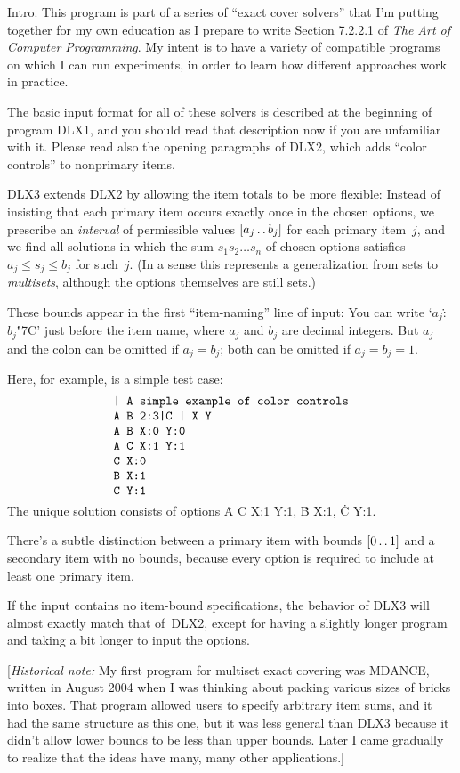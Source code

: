 
\let\Xmod=\bmod %
\def\dts{\mathinner{\ldotp\ldotp}}

\datethis

Intro. This program is part of a series of ``exact cover solvers'' that
I'm putting together for my own education as I prepare to write Section
7.2.2.1 of {\sl The Art of Computer Programming}. My intent is to
have a variety of compatible programs on which I can run experiments,
in order to learn how different approaches work in practice.

The basic input format for all of these solvers is described at the beginning
of program {\mc DLX1}, and you should read that description now if you are
unfamiliar with it. Please read also the opening paragraphs of {\mc DLX2},
which adds ``color controls'' to nonprimary items.

{\mc DLX3} extends {\mc DLX2} by allowing the item totals to be
more flexible: Instead of insisting that each primary item occurs
exactly once in the chosen options, we prescribe an {\it interval\/} of
permissible values $[a_j\dts b_j]$ for each primary item~$j$, and we find all
solutions in which the sum $s_1s_2\ldots s_n$ of chosen options satisfies
$a_j\le s_j\le b_j$ for such~$j$.
(In a sense this represents a generalization from sets to
{\it multisets\/}, although the options themselves are still sets.)

These bounds appear in the first ``item-naming'' line of input:
You can write `$a_j$\.:$b_j$\.{\char"7C}' just before the item name,
where $a_j$ and $b_j$ are decimal integers.
But $a_j$ and the colon can be omitted if $a_j=b_j$;
both can be omitted if $a_j=b_j=1$.

Here, for example, is a simple test case:
$$
\vcenter{\halign{\tt#\cr
\char"7C\ A simple example of color controls\cr
A B 2:3{\char"7C}C \char"7C\ X Y\cr
A B X:0 Y:0\cr
A C X:1 Y:1\cr
C X:0\cr
B X:1\cr
C Y:1\cr}}
$$
The unique solution consists of options \.{A C X:1 Y:1}, \.{B X:1}, \.{C Y:1}.

There's a subtle distinction between a primary item
with bounds $[0\dts1]$ and a secondary item with no bounds, because
every option is required to include at least one primary item.

If the input contains no item-bound specifications, the behavior of {\mc DLX3}
will almost exactly match that of~{\mc DLX2}, except for having a
slightly longer program and taking a bit longer to input the options.

[{\it Historical note:\/} My first program for multiset exact
covering was {\mc MDANCE}, written in August 2004 when I was thinking
about packing various sizes of bricks into boxes. That program allowed
users to specify arbitrary item sums, and it had the same structure
as this one, but it was less general than
{\mc DLX3} because it didn't allow lower bounds to be less than upper bounds.
Later I came gradually to
realize that the ideas have many, many other applications.]

